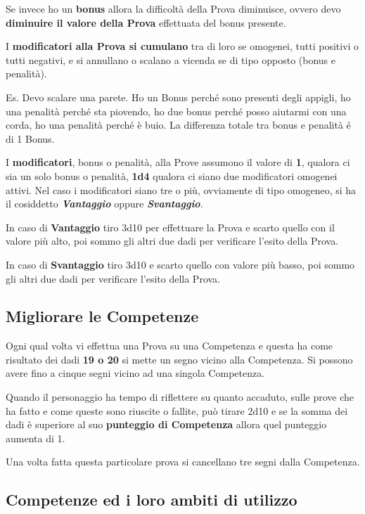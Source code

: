 \documentclass[12pt,a4paper,twoside,openany]{book}
\begin{document}
\begin{multicols}{2}
Se invece ho un \textbf{bonus} allora la difficoltà della Prova diminuisce, ovvero devo \textbf{diminuire il valore della Prova} effettuata del bonus presente.

I \textbf{modificatori alla Prova si cumulano} tra di loro se omogenei, tutti positivi o tutti negativi, e si annullano o scalano a vicenda se di tipo opposto (bonus e penalità).

Es. Devo scalare una parete. Ho un Bonus perché sono presenti degli appigli, ho una penalità perché sta piovendo, ho due bonus perché posso aiutarmi con una corda, ho una penalità perché è buio. La differenza totale tra bonus e penalità é di 1 Bonus.

I \textbf{modificatori}, bonus o penalità, alla Prove assumono il valore di \textbf{1}, qualora ci sia un solo bonus o penalità, \textbf{1d4} qualora ci siano due modificatori omogenei attivi. Nel caso i modificatori siano tre o più, ovviamente di tipo omogeneo, si ha il cosiddetto \textbf{\textit{Vantaggio}} oppure \textbf{\textit{Svantaggio}}.

In caso di \textbf{Vantaggio} tiro 3d10 per effettuare la Prova e scarto quello con il valore più alto, poi sommo gli altri due dadi per verificare l'esito della Prova.

In caso di \textbf{Svantaggio} tiro 3d10 e scarto quello con valore più basso, poi sommo gli altri due dadi per verificare l'esito della Prova. 

\subsection{Migliorare le Competenze}\hypertarget{Migliorare le Competenze}{} \label{Migliorare le Competenze}

Ogni qual volta vi effettua una Prova su una Competenza e questa ha come risultato dei dadi \textbf{19 o 20} si mette un segno vicino alla Competenza. Si possono avere fino a cinque segni vicino ad una singola Competenza.

Quando il personaggio ha tempo di riflettere su quanto accaduto, sulle prove che ha fatto e come queste sono riuscite o fallite, può tirare 2d10 e se la somma dei dadi è superiore al suo \textbf{punteggio di Competenza} allora quel punteggio aumenta di 1.

Una volta fatta questa particolare prova si cancellano tre segni dalla Competenza.	

\subsection{Competenze ed i loro ambiti di utilizzo}\label{competenzeambitidiutilizzo}


\end{multicols}
\end{document}
